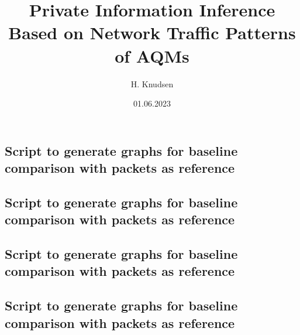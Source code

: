 \documentclass[british,titlepage]{ntnuthesis}
\title{Private Information Inference Based on Network Traffic Patterns of AQMs}
\author{H. Knudsen}
\date{01.06.2023}
\begin{document}





\tableofcontents
\listoffigures
\listoftables

\printglossaries
\printglossary[type=\acronymtype] 










\chapter*{\bibname}
\printbibliography[heading=none]

\appendix
\renewcommand{\thesection}{\Alph{section}}
\appendixpage
\section{Script to generate graphs for baseline comparison with packets as reference}
    
    \label{app:GraphsByBytes}
\newpage
\section{Script to generate graphs for baseline comparison with packets as reference}
    
    \label{app:GraphsByPackets}
\newpage
\section{Script to generate graphs for baseline comparison with packets as reference}
    
    \label{app:GraphsByBytes_BaselineEvents}
\newpage
\section{Script to generate graphs for baseline comparison with packets as reference}
    
    \label{app:GraphsByPackets_BaselineEvents}
\end{document}

